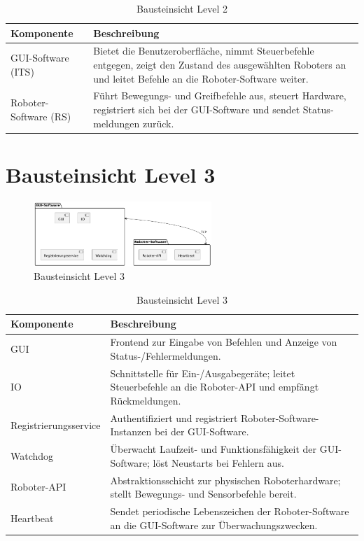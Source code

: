 \begin{table}[h!]
\centering
\begin{tabular}{|p{4cm}|p{9cm}|}
\hline
\textbf{Komponente} & \textbf{Beschreibung} \\ \hline
GUI-Software (ITS) & Bietet die Benutzeroberfläche, nimmt Steuerbefehle entgegen, zeigt den Zustand des ausgewählten Roboters an und leitet Befehle an die Roboter-Software weiter. \\ \hline
Roboter-Software (RS) & Führt Bewegungs- und Greifbefehle aus, steuert Hardware, registriert sich bei der GUI-Software und sendet Status­meldungen zurück. \\ \hline
\end{tabular}
\caption{Bausteinsicht Level 2}
\label{tab:lvl2}
\end{table}
\newpage

\section{Bausteinsicht Level 3}
\begin{figure}[h] %
    \centering
    \includegraphics[width=0.6\textwidth]{diagrams/baustein_lvl_3.png}
    \caption{Bausteinsicht Level 3}
\end{figure}

\begin{table}[h!]
\centering
\begin{tabular}{|p{4cm}|p{9cm}|}
\hline
\textbf{Komponente} & \textbf{Beschreibung} \\ \hline
GUI & Frontend zur Eingabe von Befehlen und Anzeige von Status-/Fehler­meldungen. \\ \hline
IO  & Schnittstelle für Ein-/Ausgabe­geräte; leitet Steuerbefehle an die Roboter-API und empfängt Rückmeldungen. \\ \hline
Registrierungsservice & Authentifiziert und registriert Roboter-Software-Instanzen bei der GUI-Software. \\ \hline
Watchdog & Überwacht Laufzeit- und Funktions­fähigkeit der GUI-Software; löst Neustarts bei Fehlern aus. \\ \hline
Roboter-API & Abstraktionsschicht zur physischen Roboter­hardware; stellt Bewegungs- und Sensor­befehle bereit. \\ \hline
Heartbeat & Sendet periodische Lebenszeichen der Roboter-Software an die GUI-Software zur Überwachungs­zwecken. \\ \hline
\end{tabular}
\caption{Bausteinsicht Level 3}
\label{tab:lvl3}
\end{table}

